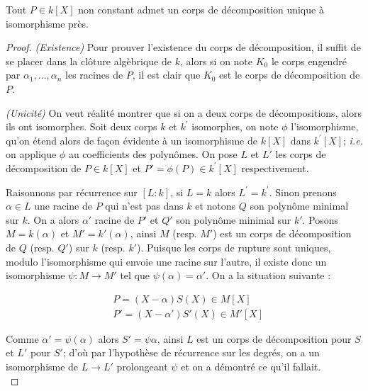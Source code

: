 \documentclass[a4paper]{article} %
\numberwithin{section}{part}
\numberwithin{equation}{section}
\begin{document}
\begin{thm}
\label{cordec}
Tout $P\in k[X]$ non constant admet un corps de décomposition unique à 
isomorphisme près.
\end{thm}
\begin{proof}
\textit{(Existence)}
Pour prouver l'existence du corps de décomposition, il suffit de se placer 
dans la clôture algèbrique de $k$, alors si on note $K_0$ le corps engendré 
par $\alpha_1,\dots,\alpha_n$ les racines de $P$, il est clair que $K_0$ est 
le corps de décomposition de $P$.\par
\textit{(Unicité)}
On veut réalité montrer que si on a deux corps de décompositions, alors ils ont
isomorphes. Soit deux corps $k$ et $k^{\prime}$ isomorphes, on note $\phi$
l'isomorphisme, qu'on étend alors de façon évidente à un isomorphisme de $k[X]$ 
dans $k^{\prime}[X]$; \textit{i.e.} on applique $\phi$ au coefficients des 
polynômes. On pose  $L$ et $L'$ les corps de décomposition de $P\in k[X]$ et $P'
= \phi(P) \in k^{\prime}[X]$ respectivement.\par
Raisonnons par récurrence sur $[L:k]$, si $L = k$ alors $L^{\prime} =
k^{\prime}$. Sinon prenons $\alpha\in L$ une racine de $P$ qui n'est pas dans
$k$ et notons $Q$ son polynôme minimal sur $k$. On a alors $\alpha'$ racine de 
$P'$ et $Q'$ son polynôme minimal sur $k'$. Posons $M = k(\alpha)$ et $M' =
k'(\alpha)$, ainsi $M$ (resp. $M'$) est un corps de décomposition de $Q$ (resp.
$Q'$) sur $k$ (resp. $k'$). Puisque les corps de rupture sont uniques, modulo
l'isomorphisme qui envoie une racine sur l'autre, il existe donc un isomorphisme
$\psi : M \to M'$ tel que $\psi(\alpha) = \alpha'$. On a la situation suivante :

\begin{align*}
&P = (X - \alpha)S(X)\in M[X]\\
&P' = (X - \alpha')S'(X)\in M'[X]
\end{align*}

Comme $\alpha' = \psi(\alpha)$ alors $S'=\psi{\alpha}$, ainsi $L$ est un corps
de décomposition pour $S$ et $L'$ pour $S'$; d'où par l'hypothèse de récurrence
sur les degrés, on a un isomorphisme de $L \to L'$ prolongeant $\psi$ et on a 
démontré ce qu'il fallait.\\
\end{proof}
\end{document}

